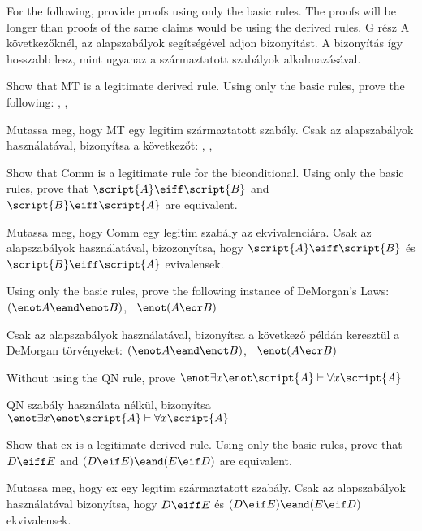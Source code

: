 \problempart
For the following, provide proofs using only the basic rules. The proofs will be longer than proofs of the same claims would be using the derived rules.
G rész A következőknél, az alapszabályok segítségével adjon bizonyítást. A bizonyítás így hosszabb lesz, mint ugyanaz a származtatott szabályok alkalmazásával.

\begin{earg}
\item Show that MT is a legitimate derived rule. Using only the basic rules, prove the following: \eif{}, \enot{}, \therefore\ \enot{}
\item Mutassa meg, hogy MT egy legitim származtatott szabály. Csak az alapszabályok használatával, bizonyítsa a következőt: \eif{}, \enot{}, \therefore\ \enot{}
\item Show that Comm is a legitimate rule for the biconditional. Using only the basic rules, prove that $\script{A}\eiff\script{B}$ and $\script{B}\eiff\script{A}$ are equivalent.
\item Mutassa meg, hogy Comm egy legitim szabály az ekvivalenciára. Csak az alapszabályok használatával, bizozonyítsa, hogy $\script{A}\eiff\script{B}$ és $\script{B}\eiff\script{A}$ evivalensek.
\item Using only the basic rules, prove the following instance of DeMorgan's Laws: $(\enot A \eand \enot B)$, \therefore\ $\enot(A \eor B)$
\item Csak az alapszabályok használatával, bizonyítsa a következő példán keresztül a DeMorgan törvényeket: $(\enot A \eand \enot B)$, \therefore\ $\enot(A \eor B)$
\item Without using the QN rule, prove $\enot\exists x\enot\script{A} \vdash \forall x\script{A}$
\item QN szabály használata nélkül, bizonyítsa $\enot\exists x\enot\script{A} \vdash \forall x\script{A}$
\item Show that {\eiff}{ex} is a legitimate derived rule. Using only the basic rules, prove that $D\eiff E$ and $(D\eif E)\eand(E\eif D)$ are equivalent.
\item Mutassa meg, hogy {\eiff}{ex} egy legitim származtatott szabály. Csak az alapszabályok használatával bizonyítsa, hogy $D\eiff E$ és $(D\eif E)\eand(E\eif D)$ ekvivalensek.
\end{earg}


